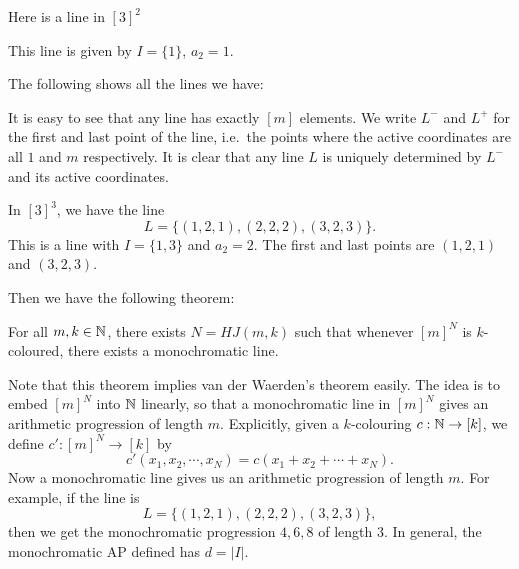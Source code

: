 \documentclass[a4paper]{article}
\begin{document}
\begin{eg}
  Here is a line in $[3]^2$
  \begin{center}
  \end{center}
  This line is given by $I = \{1\}$, $a_2 = 1$.

  The following shows all the lines we have:
  \begin{center}
  \end{center}
\end{eg}
It is easy to see that any line has exactly $[m]$ elements. We write $L^-$ and $L^+$ for the first and last point of the line, i.e.\ the points where the active coordinates are all $1$ and $m$ respectively. It is clear that any line $L$ is uniquely determined by $L^-$ and its active coordinates.

\begin{eg}
  In $[3]^3$, we have the line
  \[
    L = \{(1, 2, 1), (2, 2, 2), (3, 2, 3)\}.
  \]
  This is a line with $I = \{1, 3\}$ and $a_2 = 2$. The first and last points are $(1, 2, 1)$ and $(3, 2, 3)$.
\end{eg}

Then we have the following theorem:
\begin{thm}
  For all $m, k \in \mathbb{N}$, there exists $N = HJ(m, k)$ such that whenever $[m]^N$ is $k$-coloured, there exists a monochromatic line.
\end{thm}
Note that this theorem implies van der Waerden's theorem easily. The idea is to embed $[m]^N$ into $\mathbb{N}$ linearly, so that a monochromatic line in $[m]^N$ gives an arithmetic progression of length $m$. Explicitly, given a $k$-colouring $c: \mathbb{N} \to [k]$, we define $c': [m]^N \to [k]$ by
\[
  c'(x_1, x_2, \cdots, x_N) = c(x_1 + x_2 + \cdots + x_N).
\]
Now a monochromatic line gives us an arithmetic progression of length $m$. For example, if the line is
\[
  L = \{(1, 2, 1), (2, 2, 2), (3, 2, 3)\},
\]
then we get the monochromatic progression $4, 6, 8$ of length $3$. In general, the monochromatic AP defined has $d = |I|$.
\end{document}
